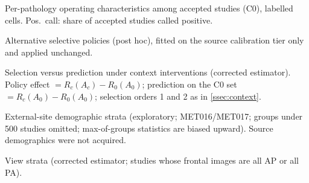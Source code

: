 \documentclass[10pt,a4paper]{article}
\begin{document}
\begin{table}[h]\centering\small
\caption{Per-pathology operating characteristics among accepted studies (C0),
labelled cells. Pos.\ call: share of accepted studies called positive.}\label{stab:operating}
\begin{adjustbox}{max width=\linewidth}\end{adjustbox}
\end{table}

\begin{table}[h]\centering\scriptsize
\caption{Alternative selective policies (post hoc), fitted on the source
calibration tier only and applied unchanged.}\label{stab:comparators}
\begin{adjustbox}{max width=\linewidth}\end{adjustbox}
\end{table}

\begin{table}[h]\centering\small
\caption{Selection versus prediction under context interventions (corrected
estimator). Policy effect $=R_c(A_c)-R_0(A_0)$; prediction on the C0 set
$=R_c(A_0)-R_0(A_0)$; selection orders 1 and 2 as in \cref{ssec:context}.}\label{stab:context}
\begin{adjustbox}{max width=\linewidth}\end{adjustbox}
\end{table}

\begin{table}[h]\centering\small
\caption{External-site demographic strata (exploratory; MET016/MET017; groups
under 500 studies omitted; max-of-groups statistics are biased upward). Source
demographics were not acquired.}\label{stab:demo}
\begin{adjustbox}{max width=\linewidth}\end{adjustbox}
\end{table}

\begin{table}[h]\centering\small
\caption{View strata (corrected estimator; studies whose frontal images are all
AP or all PA).}\label{stab:views}
\begin{adjustbox}{max width=\linewidth}\end{adjustbox}
\end{table}
\end{document}
